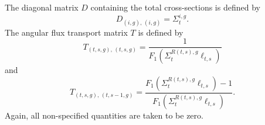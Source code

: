 The diagonal matrix $D$ containing the total cross-sections is defined by
\begin{equation}
D_{\left(i, g\right), \, \left(i, g\right)} = \Sigma_t^{i,g}.
\label{eqn:total-xs-matrix}
\end{equation}
The angular flux transport matrix $T$ is defined by
\begin{equation}
T_{\left(t,s,g\right), \, \left(t, s, g\right)} = \frac{1}{F_1\left(\Sigma_{t}^{R(t,s),g} \ell_{t,s}\right)}
\label{eqn:angular-flux-transport-matrix-1}
\end{equation}
and
\begin{equation}
T_{\left(t,s,g\right), \, \left(t, s-1, g\right)} = \frac{F_1\left(\Sigma_{t}^{R(t,s),g} \ell_{t,s}\right) - 1}{F_1\left(\Sigma_{t}^{R(t,s),g} \ell_{t,s}\right)}.
\label{eqn:angular-flux-transport-matrix-2}
\end{equation}
Again, all non-specified quantities are taken to be zero.

